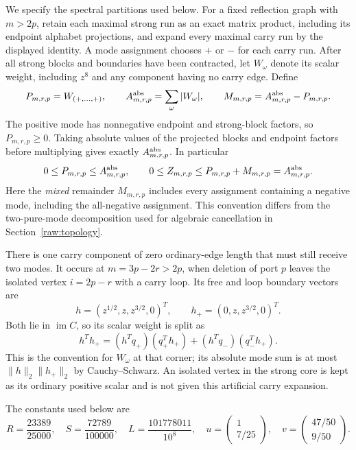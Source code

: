 \documentclass[11pt]{amsart}
\theoremstyle{definition}
\theoremstyle{remark}
\numberwithin{equation}{section}
\begin{document}
We specify the spectral partitions used below. For a fixed reflection
graph with $m>2p$, retain each maximal strong run as an exact matrix product,
including its endpoint alphabet projections, and expand every maximal
carry run by the displayed identity. A mode assignment chooses $+$ or
$-$ for each carry run. After all strong blocks and boundaries have
been contracted, let $W_\omega$ denote its scalar weight, including
$z^8$ and any component having no carry edge. Define
\begin{equation}\label{mass:mode-definitions}
 P_{m,r,p}=W_{(+,\ldots,+)},\qquad
 A^{\rm abs}_{m,r,p}=\sum_\omega|W_\omega|,\qquad
 M_{m,r,p}=A^{\rm abs}_{m,r,p}-P_{m,r,p}.
\end{equation}
The positive mode has nonnegative endpoint and strong-block factors,
so $P_{m,r,p}\ge0$. Taking absolute values of the projected blocks and
endpoint factors before multiplying gives exactly $A^{\rm abs}_{m,r,p}$.
In particular
\begin{equation}\label{mass:spectral-majorization}
 0\le P_{m,r,p}\le A^{\rm abs}_{m,r,p},\qquad
 0\le Z_{m,r,p}\le P_{m,r,p}+M_{m,r,p}=A^{\rm abs}_{m,r,p}.
\end{equation}
Here the \emph{mixed} remainder $M_{m,r,p}$ includes every assignment
containing a negative mode, including the all-negative assignment.
This convention differs from the two-pure-mode decomposition used for
algebraic cancellation in Section~\ref{raw:topology}.

There is one carry component of zero ordinary-edge length that must
still receive two modes. It occurs at
$m=3p-2r>2p$, when deletion of port $p$ leaves the isolated vertex
$i=2p-r$ with a carry loop. Its free and loop boundary vectors are
\[
 h=(z^{1/2},z,z^{3/2},0)^T,\qquad
 h_+=(0,z,z^{3/2},0)^T.
\]
Both lie in $\operatorname{im}C$, so its scalar weight is split as
\begin{equation}\label{mass:zero-edge}
 h^Th_+=(h^Tq_+)(q_+^Th_+)+(h^Tq_-)(q_-^Th_+).
\end{equation}
This is the convention for $W_\omega$ at that corner; its absolute
mode sum is at most $\|h\|_2\|h_+\|_2$ by Cauchy--Schwarz.
An isolated vertex in the strong core is kept as its ordinary positive
scalar and is not given this artificial carry expansion.

The constants used below are
\begin{equation}\label{mass:constants}
 R=\frac{23389}{25000},\quad S=\frac{72789}{100000},\quad
 L=\frac{101778011}{10^8},\quad
 u=\begin{pmatrix}1\\7/25\end{pmatrix},\quad
 v=\begin{pmatrix}47/50\\9/50\end{pmatrix}.
\end{equation}
\end{document}
